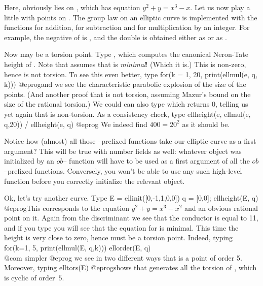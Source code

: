 Here,  obviously lies on , which has equation
$y^2+y = x^3-x$.  Let us now play a little with points on .
The group law on an elliptic curve is implemented with the functions
 for addition,  for subtraction and
 for multiplication by an integer.  For
example, the negative of  is , and the
double is obtained either as  or as
.

Now  may be a torsion point. Type , which
computes the canonical Neron-Tate height of . Note that
 assumes that  is \emph{minimal}! (Which it is.)
This is non-zero, hence  is not torsion. To see this even better,
type
\bprog
  for(k = 1, 20, print(ellmul(e, q, k)))
@eprog\noindent and we see the characteristic parabolic explosion of the size
of the points. (And another proof that  is not torsion, assuming
Mazur's bound on the size of the rational torsion.) We could can also type
 which returns 0, telling us yet again that  is
non-torsion. As a consistency check, type
\bprog
  ellheight(e, ellmul(e, q,20)) / ellheight(e, q)
@eprog\noindent
We indeed find $400=20^2$ as it should be.

Notice how (almost) all those --prefixed functions take our
elliptic curve as a first argument? This will be true with number
fields as well: whatever object was initialized by an $ob$--
function will have to be used as a first argument of all the
$ob$--prefixed functions. Conversely, you won't be able to use any
such high-level function before you correctly initialize the relevant
object. \smallskip

Ok, let's try another curve. Type
\bprog
  E = ellinit([0,-1,1,0,0])
  q = [0,0]; ellheight(E, q)
@eprog\noindent This corresponds to the equation $y^2+y = x^3-x^2$ and an
obvious rational point on it. Again from the discriminant we see that the
conductor is equal to 11, and if you type  you will
see that the equation  for  is minimal. This time the height is very
close to zero, hence  must be a torsion point. Indeed, typing
\bprog
  for(k=1, 5, print(ellmul(E, q,k)))
  ellorder(E, q)   \\@com simpler
@eprog\noindent
we see in two different ways that  is a point of order 5. Moreover,
typing
\bprog
  elltors(E)
@eprog\noindent shows that  generates all the torsion of ,
which is cyclic of order~$5$. \smallskip

